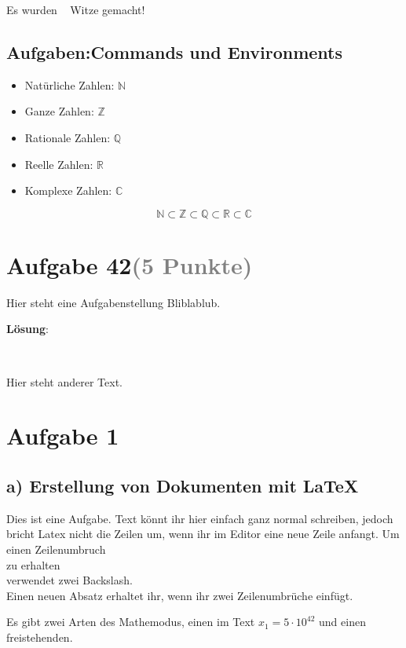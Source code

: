 \documentclass[a4paper]{scrartcl}
\newcounter{joke}
\newcommand{\bbR}{\mathbb{R}}
\newcommand{\bbZ}{\mathbb{Z}}
\newcommand{\bbQ}{\mathbb{Q}}
\newcommand{\bbN}{\mathbb{N}}
\newcommand{\bbC}{\mathbb{C}}
\newcommand{\aufgabe}[2]{
\section*{Aufgabe #1\hfill\small\textcolor{gray}{(#2 Punkte)}}
}
\newenvironment{loesung}[1][Lösung]{
    \medskip
    \noindent\textbf{#1}: 
    
    \medskip\noindent
}{\\\smallskip}
\begin{document}
\noindent
Es wurden \thejoke~ Witze gemacht!


\subsection*{Aufgaben:\quad Commands und Environments}
\begin{itemize}
    \item Natürliche Zahlen: $\bbN$
    \item Ganze Zahlen: $\bbZ$
    \item Rationale Zahlen: $\bbQ$
    \item Reelle Zahlen: $\bbR$
    \item Komplexe Zahlen: $\bbC$
\end{itemize}

\[\bbN \subset \bbZ \subset \bbQ \subset \bbR \subset \bbC\]

\aufgabe{42}{5}
Hier steht eine Aufgabenstellung Bliblablub.

\begin{loesung}
    \lipsum[5]
\end{loesung}

\noindent
Hier steht anderer Text. \lipsum[2]

\newpage




\section*{Aufgabe 1}
\subsection*{a) Erstellung von Dokumenten mit LaTeX}

Dies ist eine Aufgabe. Text könnt ihr hier einfach ganz normal schreiben, jedoch bricht
Latex
nicht
die
Zeilen
um, wenn ihr im Editor eine neue Zeile anfangt.
Um einen Zeilenumbruch \\
zu erhalten \\
verwendet zwei Backslash.\\
Einen neuen Absatz erhaltet ihr, wenn ihr zwei Zeilenumbrüche einfügt.

Es gibt zwei Arten des Mathemodus, einen im Text $x_1 = 5 \cdot 10^{42}$ und einen 
freistehenden.
\end{document}
